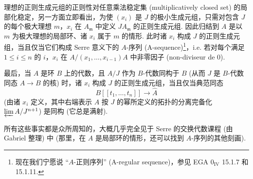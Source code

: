 理想的正则生成元组的正则性对任意乘法稳定集 (multiplicatively closed set) 的局部化稳定，另一方面立即看出，为使 $(x_i)$ 是 $J$ 的极小生成元组，只需对包含 $J$ 的每个极大理想 $m$，$x_i$ 在 $A_{\mathfrak{m}}$ 中定义 $JA_{\mathfrak{m}}$ 的正则生成元组. 因此归结到 $A$ 是以 $m$ 为极大理想的局部环、诸 $x_i$ 属于 $m$ 的情形. 此时诸 $x_i$ 构成 $J$ 的正则生成元组，当且仅当它们构成 Serre 意义下的 $A$-序列 (A-sequence)\footnote{现在我们宁愿说 ``$A$-正则序列'' (A-regular sequence)，参见 EGA 0$_{\mathrm{IV}}$ 15.1.7 和 15.1.11.}，i.e. 若对每个满足 $1 \leqslant i \leqslant n$ 的 $i$，$x_i$ 在 $A/(x_1, \dots, x_{i-1})A$ 中非零因子 (non-diviseur de 0).

最后，当 $A$ 是环 $B$ 上的代数，且 $A/J$ 作为 $B$-代数同构于 $B$ (从而 $J$ 是 $B$-代数同态 $A \to B$ 的核) 时，诸 $x_i$ 构成 $J$ 的正则生成元组，当且仅当典范同态
\[
B[\![t_1, \dots, t_n]\!] \longrightarrow \widehat{A}
\]
(由诸 $x_i$ 定义，其中右端表示 $A$ 按 $J$ 的幂所定义的拓扑的分离完备化 $\varprojlim A/J^{n+1}$) 是同构 (它总是满射).

所有这些事实都是众所周知的，大概几乎完全见于 Serre 的交换代数课程 (由 Gabriel 整理) 中 (那里，在 $A$ 是局部环的情形，还可以找到 $A$-序列的其他刻画).

